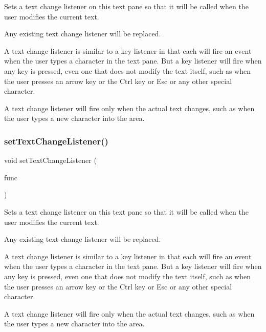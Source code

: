Sets a text change listener on this text pane so that it will be called when the user modifies the current text. 

Any existing text change listener will be replaced.

A text change listener is similar to a key listener in that each will fire an event when the user types a character in the text pane. But a key listener will fire when any key is pressed, even one that does not modify the text itself, such as when the user presses an arrow key or the Ctrl key or Esc or any other special character.

A text change listener will fire only when the actual text changes, such as when the user types a new character into the area. \mbox{\label{classGBrowserPane_ae8df75b0746951146d29220f386fcd33}} 
\subsubsection{\texorpdfstring{set\+Text\+Change\+Listener()}{setTextChangeListener()}\hspace{0.1cm}{\footnotesize\ttfamily [2/2]}}
{\footnotesize\ttfamily void set\+Text\+Change\+Listener (\begin{DoxyParamCaption}\item[{G\+Event\+Listener\+Void}]{func }\end{DoxyParamCaption})\hspace{0.3cm}{\ttfamily [virtual]}}



Sets a text change listener on this text pane so that it will be called when the user modifies the current text. 

Any existing text change listener will be replaced.

A text change listener is similar to a key listener in that each will fire an event when the user types a character in the text pane. But a key listener will fire when any key is pressed, even one that does not modify the text itself, such as when the user presses an arrow key or the Ctrl key or Esc or any other special character.

A text change listener will fire only when the actual text changes, such as when the user types a new character into the area. \mbox{\label{classGInteractor_a039e0e49beaecc275efce02d416acea8}} 
